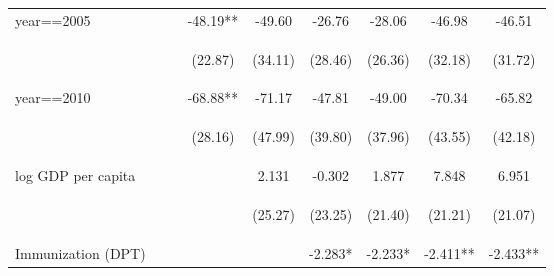 \begin{table}[htpb!]
\begin{center}
\begin{tabular}{lcccccccc}
year==2005&&&-48.19**&-49.60&-26.76&-28.06&-46.98&-46.51\\
&&&\begin{footnotesize}(22.87)\end{footnotesize}&\begin{footnotesize}(34.11)\end{footnotesize}&\begin{footnotesize}(28.46)\end{footnotesize}&\begin{footnotesize}(26.36)\end{footnotesize}&\begin{footnotesize}(32.18)\end{footnotesize}&\begin{footnotesize}(31.72)\end{footnotesize}\\
year==2010&&&-68.88**&-71.17&-47.81&-49.00&-70.34&-65.82\\
&&&\begin{footnotesize}(28.16)\end{footnotesize}&\begin{footnotesize}(47.99)\end{footnotesize}&\begin{footnotesize}(39.80)\end{footnotesize}&\begin{footnotesize}(37.96)\end{footnotesize}&\begin{footnotesize}(43.55)\end{footnotesize}&\begin{footnotesize}(42.18)\end{footnotesize}\\
log GDP per capita&&&&2.131&-0.302&1.877&7.848&6.951\\
&&&&\begin{footnotesize}(25.27)\end{footnotesize}&\begin{footnotesize}(23.25)\end{footnotesize}&\begin{footnotesize}(21.40)\end{footnotesize}&\begin{footnotesize}(21.21)\end{footnotesize}&\begin{footnotesize}(21.07)\end{footnotesize}\\
Immunization (DPT) &&&&&-2.283*&-2.233*&-2.411**&-2.433**\\

\end{tabular}
\end{center}
\end{table}
